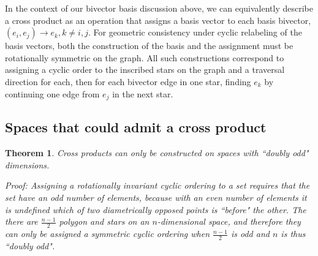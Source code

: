 \documentclass[11pt]{article}
\newcommand{\bv}[1][]{e_{#1}}
\newcommand{\bp}[2]{(#1,#2)}
\newtheorem{theorem}{Theorem}[section]
\begin{document}
In the context of our bivector basis discussion above, we can equivalently describe a cross product as an operation that assigns a basis vector to each basis bivector, $\bp{\bv[i]}{\bv[j]} \rightarrow \bv[k], k\neq i,j$. For geometric consistency under cyclic relabeling of the basis vectors, both the construction of the basis and the assignment must be rotationally symmetric on the graph. All such constructions correspond to assigning a cyclic order to the inscribed stars on the graph and a traversal direction for each, then for each bivector edge in one star, finding $\bv[k]$ by continuing one edge from $\bv[j]$ in the next star.

\subsection{Spaces that could admit a cross product}

\begin{theorem}{Cross products can only be constructed on spaces with ``doubly odd" dimensions.}

Proof: Assigning a rotationally invariant cyclic ordering to a set requires that the set have an odd number of elements, because with an even number of elements it is undefined which of two diametrically opposed points is ``before" the other. The there are $\frac{n-1}{2}$ polygon and stars on an $n$-dimensional space, and therefore they can only be assigned a symmetric cyclic ordering when $\frac{n-1}{2}$  is odd and $n$ is thus ``doubly odd".

\end{theorem}

\end{document}
